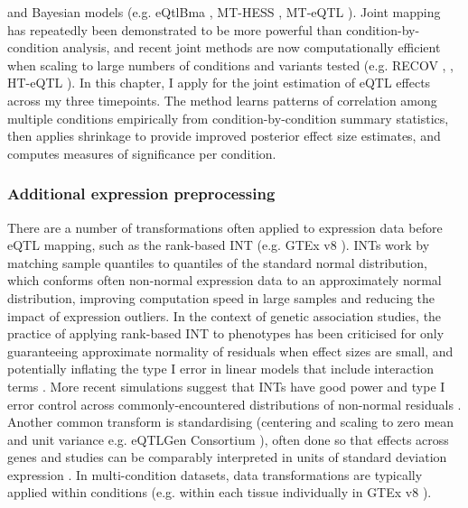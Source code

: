 and Bayesian models (e.g. eQtlBma \autocite{flutre2013StatisticalFrameworkJoint}, MT-HESS \autocite{lewin2016MTHESSEfficientBayesian}, MT-eQTL \autocite{li2018EmpiricalBayesApproach}).
Joint mapping has repeatedly been demonstrated to be more powerful than condition-by-condition analysis,
and recent joint methods are now computationally efficient when scaling to large numbers of conditions and variants tested (e.g. RECOV \autocite{duong2017ApplyingMetaanalysisGenotypetissue},  \autocite{urbut2018FlexibleStatisticalMethods}, HT-eQTL \autocite{li2018HTeQTLIntegrativeExpression}).
In this chapter, I apply  \autocite{urbut2018FlexibleStatisticalMethods} for the joint estimation of \gls{eQTL} effects across my three timepoints.
The method learns patterns of correlation among multiple conditions empirically from condition-by-condition summary statistics,
then applies shrinkage to provide improved posterior effect size estimates, and computes measures of significance per condition. 


\subsubsection{Additional expression preprocessing}

There are a number of transformations often applied to expression data before \gls{eQTL} mapping, 
such as the rank-based \gls{INT} (e.g. GTEx v8 \autocite{aguet2019GTExConsortiumAtlas}).
\glspl{INT} work by matching sample quantiles to quantiles of the standard normal distribution,
which conforms often non-normal expression data to an approximately normal distribution, 
improving computation speed in large samples \autocite{mccaw2020OperatingCharacteristicsRank} and reducing the impact of expression outliers.
In the context of genetic association studies, the practice of applying rank-based \gls{INT} to phenotypes has been criticised for only guaranteeing approximate normality of residuals when effect sizes are small,
and potentially inflating the type I error in linear models that include interaction terms \autocite{beasley2009RankBasedInverseNormal}.
More recent simulations suggest that \glspl{INT} have good power and type I error control across commonly-encountered distributions of non-normal residuals \autocite{mccaw2020OperatingCharacteristicsRank}.
Another common transform is standardising (centering and scaling to zero mean and unit variance e.g. eQTLGen Consortium \autocite{vosa2018UnravelingPolygenicArchitecture}),
often done so that effects across genes and studies can be comparably interpreted in units of standard deviation expression \autocite{qi2018IdentifyingGeneTargets}.
In multi-condition datasets, data transformations are typically applied within conditions (e.g. within each tissue individually in GTEx v8 \autocite{aguet2019GTExConsortiumAtlas}).


